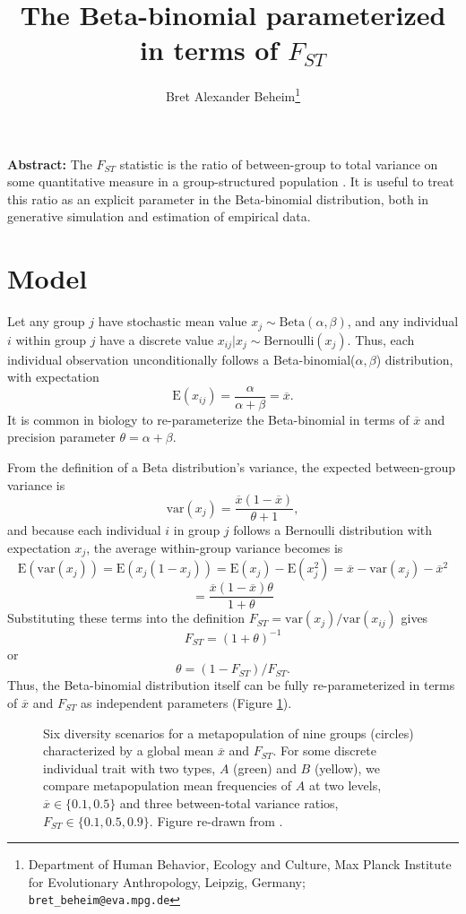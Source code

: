 \documentclass[11pt]{article}
\title{The Beta-binomial parameterized in terms of $F_{ST}$}
\author[1]{Bret Alexander Beheim\thanks{Department of Human Behavior, Ecology and Culture, Max Planck Institute for Evolutionary Anthropology, Leipzig, Germany; \texttt{bret\_beheim@eva.mpg.de}}}
\date{} %
\begin{document}
\maketitle %

\textbf{Abstract:} The $F_{ST}$ statistic is the ratio of between-group to total variance on some quantitative measure in a group-structured population \citep{holsinger2009genetics}. It is useful to treat this ratio as an explicit parameter in the Beta-binomial distribution, both in generative simulation and estimation of empirical data.

\section{Model}

Let any group $j$ have stochastic mean value $x_j \sim \mathrm{Beta}(\alpha, \beta)$, and any individual $i$ within group $j$ have a discrete value $x_{ij}|x_j \sim \mathrm{Bernoulli}(x_j)$. Thus, each individual observation unconditionally follows a Beta-binomial($\alpha, \beta$) distribution, with expectation 
\[
  \mathrm{E}(x_{ij}) = \frac{\alpha}{\alpha + \beta} = \overline{x}.
\]
It is common in biology to re-parameterize the Beta-binomial in terms of $\overline{x}$ and precision parameter $\theta = \alpha + \beta$.

From the definition of a Beta distribution's variance, the expected between-group variance is
\[
  \mathrm{var}(x_j) = \frac{\overline{x} (1 - \overline{x})}{\theta + 1},
\]
and because each individual $i$ in group $j$ follows a Bernoulli distribution with expectation $x_j$, the average within-group variance becomes is
\[
  \mathrm{E}(\mathrm{var}(x_j)) = \mathrm{E}(x_j(1-x_j)) = \mathrm{E}(x_j) - \mathrm{E}(x_j^2) = \overline{x} - \mathrm{var}(x_j) - \overline{x}^2
\]
\[
  = \frac{\overline{x} (1 - \overline{x}) \theta}{1 + \theta}
\]
Substituting these terms into the definition $F_{ST} = \mathrm{var}(x_j)/\mathrm{var}(x_{ij})$ gives
\[
  F_{ST} = (1 + \theta)^{-1}
\]
or 
\[
  \theta = (1 - F_{ST})/F_{ST}.
\]
Thus, the Beta-binomial distribution itself can be fully re-parameterized in terms of $\overline{x}$ and $F_{ST}$ as independent parameters (Figure \ref{fig:pieExamples}).

\begin{figure}[t]
  \centering
  \resizebox{6in}{!}{%
    
  }
  \caption{Six diversity scenarios for a metapopulation of nine groups (circles) characterized by a global mean $\overline{x}$ and $F_{ST}$. For some discrete individual trait with two types, $A$ (green) and $B$ (yellow), we compare metapopulation mean frequencies of $A$ at two levels, $\overline{x} \in \{0.1, 0.5\}$ and three between-total variance ratios, $F_{ST} \in \{0.1, 0.5, 0.9\}$. Figure re-drawn from \cite{beheim2023distance}.}
  \label{fig:pieExamples}
\end{figure}
\end{document}
